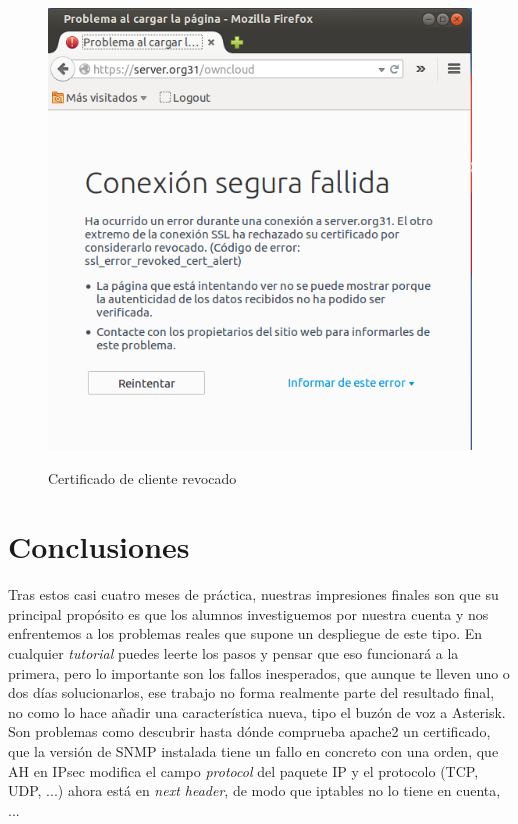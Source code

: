 \documentclass[]{article}
\begin{document}
\begin{figure}[h]
	\caption{Certificado de cliente revocado}
	\centering
	\includegraphics[scale=0.5]{images/certs/revoked.png}
	\label{fig:revoked}
\end{figure}



\section{Conclusiones}

Tras estos casi cuatro meses de práctica, nuestras impresiones finales son que su principal propósito es que los alumnos investiguemos por nuestra cuenta y nos enfrentemos a los problemas reales que supone un despliegue de este tipo. En cualquier \textit{tutorial} puedes leerte los pasos y pensar que eso funcionará a la primera, pero lo importante son los fallos inesperados, que aunque te lleven uno o dos días solucionarlos, ese trabajo no forma realmente parte del resultado final, no como lo hace añadir una característica nueva, tipo el buzón de voz a Asterisk. Son problemas como descubrir hasta dónde comprueba apache2 un certificado, que la versión de SNMP instalada tiene un fallo en concreto con una orden, que AH en IPsec modifica el campo \textit{protocol} del paquete IP y el protocolo (TCP, UDP, ...) ahora está en \textit{next header}, de modo que iptables no lo tiene en cuenta, ...
               
\end{document}
